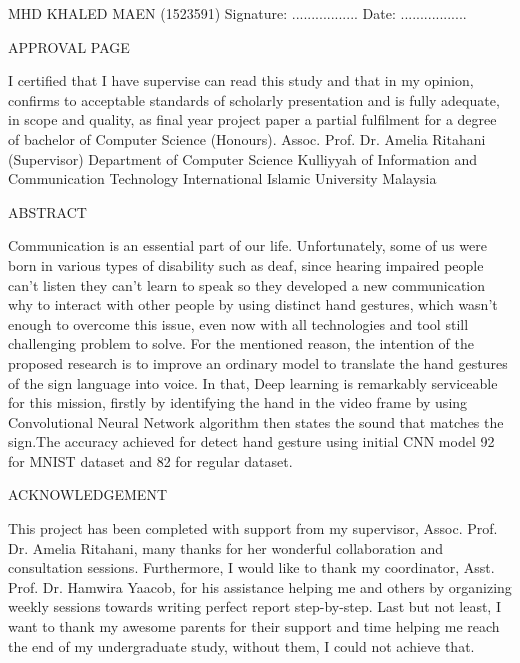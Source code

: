 \documentclass[12pt]{report}
\begin{document}
\mbox{}
\vfill
MHD KHALED MAEN (1523591)
\bigbreak
Signature: .................\hspace{18em} Date: .................
\bigbreak

\newpage
\begin{center}
    \LARGE APPROVAL PAGE
\end{center} 

I certified that I have supervise can read this study and that in my opinion,
confirms to acceptable standards of scholarly presentation and is fully adequate,
in scope and quality, as final year project paper a partial fulfilment for a 
degree of bachelor of Computer Science (Honours).
\mbox{}
\vfill
Assoc. Prof. Dr. Amelia Ritahani (Supervisor)
\bigbreak
Department of Computer Science
\bigbreak
Kulliyyah of Information and Communication Technology
\bigbreak
International Islamic University Malaysia
\bigbreak

\newpage

\begin{center}
    \LARGE ABSTRACT
\end{center}

Communication is an essential part of our life.
Unfortunately, some of us were born in various types of disability such as deaf,
since hearing impaired people can't listen they can't learn to speak so they developed 
a new communication why to interact with other people by using distinct hand gestures, 
which wasn't enough to overcome this issue, even now with all technologies and tool still challenging problem to solve.
For the mentioned reason, 
the intention of the proposed research is to improve an ordinary model to translate the hand gestures of the sign language into voice.
In that, Deep learning is remarkably serviceable for this mission, 
firstly by identifying the hand in the video frame by using Convolutional
Neural Network algorithm then states the sound that matches the sign.The accuracy achieved for detect hand gesture using initial CNN model 92 \text{\%} for MNIST
dataset and 82\text{\%} for regular dataset.


\newpage
\begin{center}
    \LARGE ACKNOWLEDGEMENT
\end{center} 

This project has been completed with support from my supervisor, Assoc. Prof. Dr. Amelia Ritahani, many thanks for her wonderful 
collaboration and consultation sessions. Furthermore, 
I would like to thank my coordinator, Asst. Prof. Dr. Hamwira Yaacob, for his 
assistance helping me and others by organizing weekly sessions towards writing perfect report step-by-step. 
Last but not least,
I want to thank my awesome parents for their support and time helping me reach the end of my undergraduate study, without them, I could not achieve that.
\end{document}
